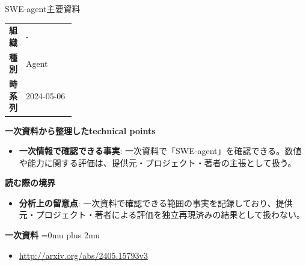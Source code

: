 \begin{technicalnote}{SWE-agent}{主要資料}
\begingroup
\begin{tabularx}{\linewidth}{@{}>{\bfseries}p{0.22\linewidth}X@{}}
組織 & - \\
種別 & Agent \\
時系列 & 2024-05-06 \\
\end{tabularx}
\smallskip
{\bfseries 一次資料から整理したtechnical points}
\begin{itemize}[leftmargin=1.5em,itemsep=0.35em]
\item \textbf{一次情報で確認できる事実}: 一次資料で「SWE-agent」を確認できる。数値や能力に関する評価は、提供元・プロジェクト・著者の主張として扱う。
\end{itemize}
\begin{minipage}{\linewidth}
{\bfseries 読む際の境界}
\begin{itemize}[leftmargin=1.5em,itemsep=0.35em]
\item \textbf{分析上の留意点}: 一次資料で確認できる範囲の事実を記録しており、提供元・プロジェクト・著者による評価を独立再現済みの結果として扱わない。
\end{itemize}
\begin{samepage}
{\bfseries 一次資料}
\begingroup\sloppy
\Urlmuskip=0mu plus 2mu\relax
\begin{itemize}[leftmargin=1.5em,itemsep=0.25em]
\item {\scriptsize\url{http://arxiv.org/abs/2405.15793v3}}
\end{itemize}
\endgroup
\end{samepage}
\end{minipage}
\endgroup
\end{technicalnote}
\medskip

